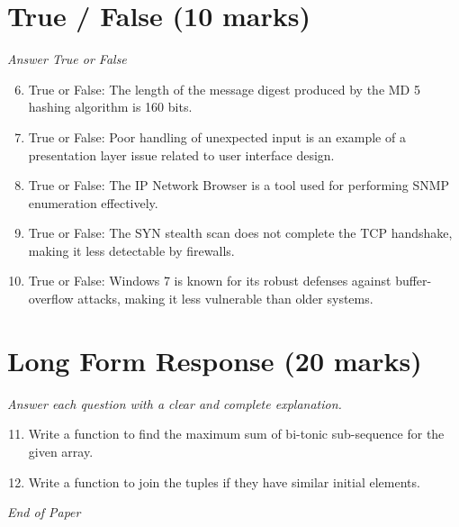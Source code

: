\documentclass[12pt]{article}
\begin{document}
\section*{True / False (10 marks)}
\textit{Answer True or False}
\begin{enumerate}[label=\arabic*.]
\setcounter{enumi}{5}
\item True or False: The length of the message digest produced by the MD 5 hashing algorithm is 160 bits.
\item True or False: Poor handling of unexpected input is an example of a presentation layer issue related to user interface design.
\item True or False: The IP Network Browser is a tool used for performing SNMP enumeration effectively.
\item True or False: The SYN stealth scan does not complete the TCP handshake, making it less detectable by firewalls.
\item True or False: Windows 7 is known for its robust defenses against buffer-overflow attacks, making it less vulnerable than older systems.
\end{enumerate}

\section*{Long Form Response (20 marks)}
\textit{Answer each question with a clear and complete explanation.}
\begin{enumerate}[label=\arabic*.]
\setcounter{enumi}{10}
\item Write a function to find the maximum sum of bi-tonic sub-sequence for the given array.
\item Write a function to join the tuples if they have similar initial elements.
\end{enumerate}

\vfill
\noindent\textit{End of Paper}
\end{document}

